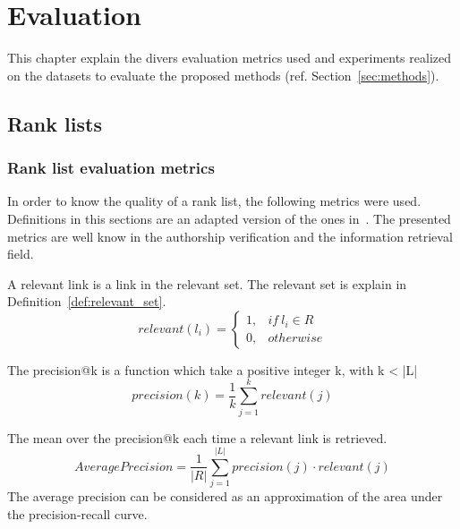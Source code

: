 \section{Evaluation \label{sec:evaluation}}

This chapter explain the divers evaluation metrics used and experiments realized on the datasets to evaluate the proposed methods (ref. Section~\ref{sec:methods}).

\subsection{Rank lists}

\subsubsection{Rank list evaluation metrics}
\label{sec:rl_eval}

In order to know the quality of a rank list, the following metrics were used.
Definitions in this sections are an adapted version of the ones in~\cite{kocher_linking}.
The presented metrics are well know in the authorship verification and the information retrieval field.

\begin{definition}
  A relevant link is a link in the relevant set.
  The relevant set is explain in Definition~\ref{def:relevant_set}.
  \begin{equation}
    relevant(l_i) =
    \begin{cases}
      1, & if\ l_i \in R \\
      0, & otherwise
    \end{cases}
  \end{equation}
\end{definition}

\begin{definition}
  The precision@k is a function which take a positive integer k, with k < |L|
  \begin{equation}
    precision(k) = \frac{1}{k} \sum_{j=1}^{k} relevant(j)
  \end{equation}
\end{definition}

\begin{definition}
  The mean over the precision@k each time a relevant link is retrieved.
  \begin{equation}
    AveragePrecision = \frac{1}{|R|} \sum_{j=1}^{|L|} precision(j) \cdot relevant(j)
  \end{equation}
  The average precision can be considered as an approximation of the area under the precision-recall curve.
\end{definition}

